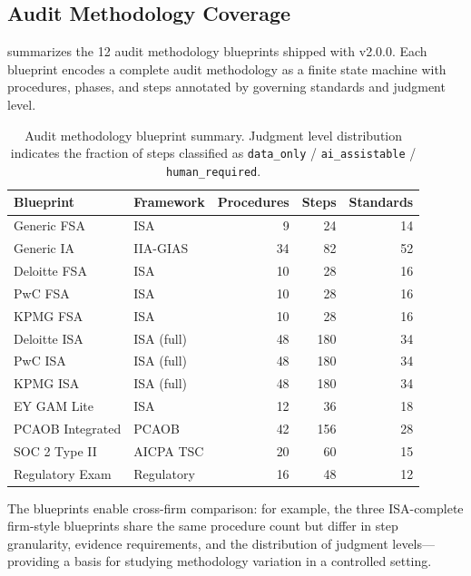 \subsection{Audit Methodology Coverage}
\label{sec:exp_audit}

 summarizes the 12 audit methodology
blueprints shipped with \system{} v2.0.0.  Each blueprint encodes a
complete audit methodology as a finite state machine with procedures,
phases, and steps annotated by governing standards and judgment level.

\begin{table}[t]
\centering
\caption{Audit methodology blueprint summary.  Judgment level
  distribution indicates the fraction of steps classified as
  \texttt{data\_only} / \texttt{ai\_assistable} / \texttt{human\_required}.}
\label{tab:blueprint_summary}
\small
\begin{tabular}{llrrr}
\toprule
\textbf{Blueprint} & \textbf{Framework} & \textbf{Procedures}
  & \textbf{Steps} & \textbf{Standards} \\
\midrule
Generic FSA       & ISA         &  9 &  24 & 14 \\
Generic IA        & IIA-GIAS    & 34 &  82 & 52 \\
Deloitte FSA      & ISA         & 10 &  28 & 16 \\
PwC FSA           & ISA         & 10 &  28 & 16 \\
KPMG FSA          & ISA         & 10 &  28 & 16 \\
Deloitte ISA      & ISA (full)  & 48 & 180 & 34 \\
PwC ISA           & ISA (full)  & 48 & 180 & 34 \\
KPMG ISA          & ISA (full)  & 48 & 180 & 34 \\
EY GAM Lite       & ISA         & 12 &  36 & 18 \\
PCAOB Integrated  & PCAOB       & 42 & 156 & 28 \\
SOC 2 Type II     & AICPA TSC   & 20 &  60 & 15 \\
Regulatory Exam   & Regulatory  & 16 &  48 & 12 \\
\bottomrule
\end{tabular}
\end{table}

The blueprints enable cross-firm comparison: for example, the three
ISA-complete firm-style blueprints share the same procedure count but
differ in step granularity, evidence requirements, and the distribution
of judgment levels---providing a basis for studying methodology
variation in a controlled setting.

